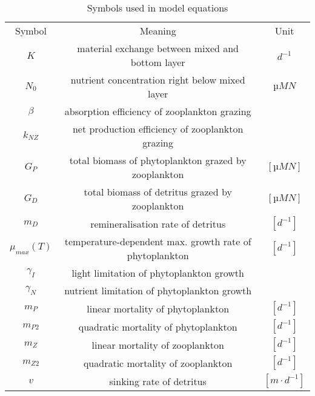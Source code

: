 \documentclass[journal abbreviation, manuscript]{copernicus}
\begin{document}
\begin{table*}[t]
\caption{Symbols used in model equations}
\begin{tabular}{c c c}
Symbol & Meaning & Unit\\
\tophline
$K$ & material exchange between mixed and bottom layer & $\unit{d^{-1}}$ \\
$N_0$ & nutrient concentration right below mixed layer & $\unit{µM N}$ \\
$\beta$ & absorption efficiency of zooplankton grazing &  \\
$k_{NZ}$ & net production efficiency of zooplankton grazing &  \\
$G_P$ & total biomass of phytoplankton grazed by zooplankton & $[µM N]$ \\
$G_D$ & total biomass of detritus grazed by zooplankton & $[µM N]$ \\
$m_D$ & remineralisation rate of detritus & $[d^{-1}]$ \\
$\mu_{max}(T)$ & temperature-dependent max. growth rate of phytoplankton & $[d^{-1}]$ \\
$\gamma_I$ & light limitation of phytoplankton growth &  \\
$\gamma_N$ & nutrient limitation of phytoplankton growth &  \\
$m_P$ & linear mortality of phytoplankton & $[d^{-1}]$ \\
$m_{P2}$ & quadratic mortality of phytoplankton & $[d^{-1}]$ \\
$m_Z$ & linear mortality of zooplankton & $[d^{-1}]$ \\
$m_{Z2}$ & quadratic mortality of zooplankton & $[d^{-1}]$ \\
$v$ & sinking rate of detritus & $[m \cdot d^{-1}]$\\
\end{tabular}
\end{table*}
\end{document}
